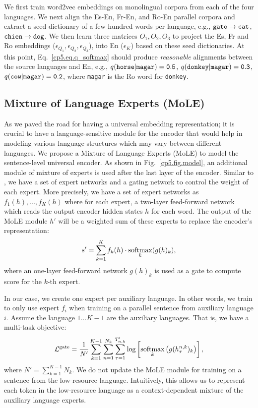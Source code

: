 We first train word2vec embeddings on monolingual corpora from each of the four languages. We next align the Es-En, Fr-En, and Ro-En parallel corpora and extract a seed dictionary of a few hundred words per language, e.g., ${\tt gato} \rightarrow {\tt cat}$,  ${\tt chien} \rightarrow {\tt dog}$. We then learn three matrices $O_1, O_2, O_3$ to project the Es, Fr and Ro embeddings ($\epsilon_{Q_1}, \epsilon_{Q_2}, \epsilon_{Q_3}$), into En ($\epsilon_K$) based on these seed dictionaries. At this point, Eq.~\eqref{cp5.eq.q_softmax} should produce \textit{reasonable} alignments between the source languages and En, e.g., $q(\tt{horse}|\tt{magar}) = 0.5$, $q(\tt{donkey}|\tt{magar}) = 0.3$, $q(\tt{cow}|\tt{magar}) = 0.2$, where {\tt magar} is the Ro word for {\tt donkey}. %

\subsection{Mixture of Language Experts (MoLE)}
\label{cp5.sec.moe}
As we paved the road for having a universal embedding representation; it is crucial to have a  language-sensitive module for the encoder that would help in modeling various  language structures which may  vary between different languages. 
We propose a Mixture of Language Experts (MoLE) to model the sentence-level universal encoder. As shown in Fig.~\ref{cp5.fig.model}, 
an additional module of mixture of experts is used after the last layer of the encoder. Similar to \cite{shazeer2017outrageously}, we have a set of expert networks and a gating network  to control the weight of each expert. More precisely, we have a set of expert networks as $f_1(h), ..., f_{K}(h)$ where for each expert, a two-layer feed-forward network which reads the output encoder hidden states $h$ for each word. The output of the MoLE module $h'$ will be a weighted sum of these experts to replace the encoder's representation:
\begin{equation}
s'=\sum_{k=1}^K f_k(h)\cdot \mathop{\operatorname{\text{softmax}}}\limits_{k}(g(h)_k),
\end{equation}
where an one-layer feed-forward network $g(h)_k$ is used as a gate to compute score for the  $k$-th expert.

In our case, we create one expert per auxiliary language. In other words, we train to only use expert $f_i$ when training on a parallel sentence from auxiliary language $i$. Assume the language $1 ... K-1$ are the auxiliary languages. That is, we have a multi-task objective:
\begin{equation}
\begin{split}
\mathcal{L}^{\text{gate}} = \frac{1}{N'}\sum_{k=1}^{K-1}\sum_{n=1}^{N_k}\sum_{\tau=1}^{T'_{n, k}}\log \left[\mathop{\operatorname{\text{softmax}}}\limits_{k}\left(g(h^{n, k}_\tau)_k\right)\right],
\end{split}
\end{equation}
where $N'=\sum_{k=1}^{K-1}N_k$. We do not update the MoLE module for training on a sentence from the low-resource language. Intuitively, this allows us to represent each token in the low-resource language as a context-dependent mixture of the auxiliary language experts.

